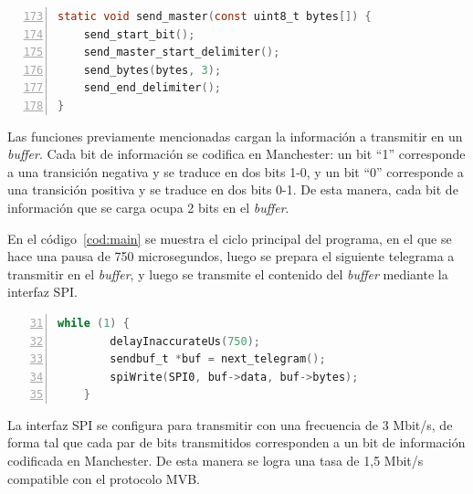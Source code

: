 \begin{lstlisting}[label=cod:sendmaster,caption=Secuencia de pasos para transmitir la trama \textit{master} (\texttt{gen.c}).,float=htbp,numberstyle=\footnotesize\ttfamily,language=C,breaklines=true,numbers=left,firstnumber=173,xleftmargin=1cm]
static void send_master(const uint8_t bytes[]) {
    send_start_bit();
    send_master_start_delimiter();
    send_bytes(bytes, 3);
    send_end_delimiter();
}
\end{lstlisting}

Las funciones previamente mencionadas cargan la información a transmitir en un \textit{buffer}. Cada bit de información se codifica en Manchester: un bit ``1'' corresponde a una transición negativa y se traduce en dos bits 1-0, y un bit ``0'' corresponde a una transición positiva y se traduce en dos bits 0-1. De esta manera, cada bit de información que se carga ocupa 2 bits en el \textit{buffer}.

En el código~\ref{cod:main} se muestra el ciclo principal del programa, en el que se hace una pausa de 750 microsegundos, luego se prepara el siguiente telegrama a transmitir en el \textit{buffer}, y luego se transmite el contenido del \textit{buffer} mediante la interfaz SPI.

\begin{lstlisting}[label=cod:main,caption=Ciclo principal del programa (\texttt{main.c}).,float=htbp,numberstyle=\footnotesize\ttfamily,language=C,breaklines=true,numbers=left,firstnumber=31,xleftmargin=1cm]
    while (1) {
        delayInaccurateUs(750);
        sendbuf_t *buf = next_telegram();
        spiWrite(SPI0, buf->data, buf->bytes);
    }
\end{lstlisting}

La interfaz SPI se configura para transmitir con una frecuencia de 3 Mbit/s, de forma tal que cada par de bits transmitidos corresponden a un bit de información codificada en Manchester. De esta manera se logra una tasa de 1,5 Mbit/s compatible con el protocolo MVB.

